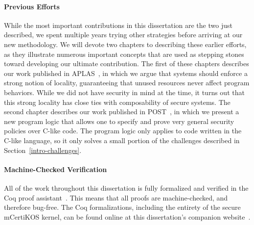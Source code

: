 \paragraph{Previous Efforts}
While the most important contributions in this dissertation are
the two just described, we spent multiple years trying other
strategies before arriving at our
new methodology. We will devote two chapters to describing 
these earlier efforts, as they illustrate numerous important
concepts that are used as stepping stones toward developing our
ultimate contribution. The first of these chapters describes our work
published in APLAS~\cite{costanzo-bpsl}, in which we argue that 
systems should enforce a strong notion of locality, guaranteeing
that unused resources never affect program behaviors. While
we did not have security in mind at the time, it turns out that
this strong locality has close ties with composability of
secure systems. The second chapter describes our work published
in POST~\cite{costanzo-ddifc}, in which we present a new program logic
that allows one to specify and prove very general security 
policies over C-like code. The program logic only applies to
code written in the C-like language, so it only solves a 
small portion of the challenges described in 
Section~\ref{intro-challenges}.

\paragraph{Machine-Checked Verification}
All of the work throughout this dissertation is fully
formalized and verified in the Coq proof assistant~\cite{coq}.
This means that all proofs are machine-checked, and therefore bug-free.
The Coq formalizations, including the entirety of the secure
mCertiKOS kernel, can be found online at this dissertation's
companion website~\cite{costanzo-thesis}.



